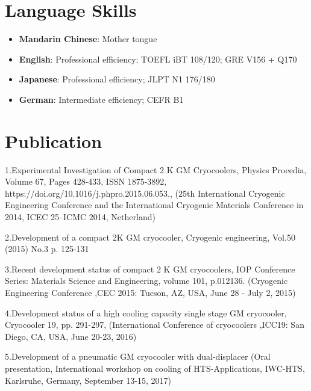 \documentclass[letterpaper,11pt]{article}
\newcommand{\resumeItem}[2]{
  \item\small{
    \textbf{#1}{: #2 \vspace{-2pt}}
  }
}
\newcommand{\resumeSubItem}[2]{\resumeItem{#1}{#2}\vspace{-4pt}}
\newcommand{\resumeSubHeadingListStart}{\begin{itemize}[leftmargin=*]}
\newcommand{\resumeSubHeadingListEnd}{\end{itemize}}
\begin{document}
\section{Language Skills}
\resumeSubHeadingListStart
  \resumeSubItem{Mandarin Chinese}{Mother tongue}
  \resumeSubItem{English}{Professional efficiency; TOEFL iBT 108/120; GRE V156 + Q170}
  \resumeSubItem{Japanese}{Professional efficiency; JLPT N1 176/180}
  \resumeSubItem{German}{Intermediate efficiency; CEFR B1}
\resumeSubHeadingListEnd


\section{Publication}
1.Experimental Investigation of Compact 2 K GM Cryocoolers, Physics Procedia, Volume 67, Pages 428-433, ISSN 1875-3892,
https://doi.org/10.1016/j.phpro.2015.06.053., (25th International Cryogenic Engineering Conference and the International Cryogenic Materials Conference in 2014, ICEC 25–ICMC 2014, Netherland)

2.Development of a compact 2K GM cryocooler, Cryogenic engineering, Vol.50 (2015) No.3 p. 125-131

3.Recent development status of compact 2 K GM cryocoolers,
IOP Conference Series: Materials Science and Engineering,
volume 101,
p.012136.
(Cryogenic Engineering Conference ,CEC 2015: Tucson, AZ, USA, June 28 - July 2, 2015)

4.Development status of a high cooling capacity single stage GM cryocooler,
Cryocooler 19,
pp. 291-297,
(International Conference of cryocoolers ,ICC19: San Diego, CA, USA, June 20-23, 2016)

5.Development of a pneumatic GM cryocooler with dual-displacer (Oral presentation, International workshop on cooling of HTS-Applications, IWC-HTS, Karlsruhe, Germany, September 13-15, 2017)

\end{document}
